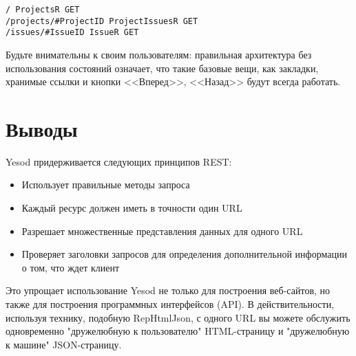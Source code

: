 \begin{lstlisting}
/ ProjectsR GET
/projects/#ProjectID ProjectIssuesR GET
/issues/#IssueID IssueR GET
\end{lstlisting}

Будьте внимательны к своим пользователям: правильная архитектура без использования состояний означает, что такие базовые вещи, как закладки, хранимые ссылки и кнопки <<Вперед>>, <<Назад>> будут всегда работать.

\section{Выводы}

Yesod придерживается следующих принципов REST:
\begin{itemize}
 \item Использует правильные методы запроса
 \item Каждый ресурс должен иметь в точности один URL
 \item Разрешает множественные представления данных для одного URL
 \item Проверяет заголовки запросов для определения дополнительной информации о том, что ждет клиент
\end{itemize}

Это упрощает использование Yesod не только для построения веб-сайтов, но также для построения программных интерфейсов (API). В действительности, используя технику, подобную RepHtmlJson, с одного URL вы можете обслужить одновременно "дружелюбную к пользователю" HTML-страницу и "дружелюбную к машине" JSON-страницу.







 



